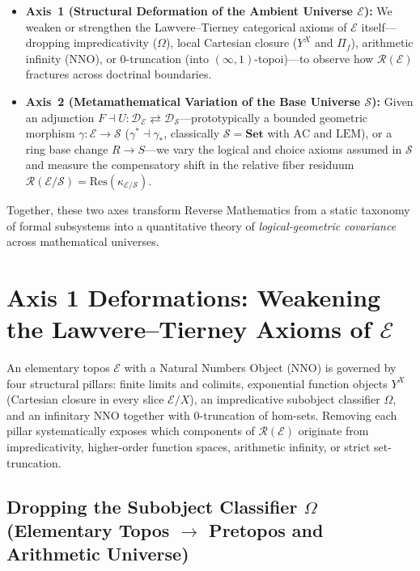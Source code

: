 \begin{itemize}

  \item \textbf{Axis~1 (Structural Deformation of the Ambient Universe $\mathcal{E}$):} We weaken or strengthen the Lawvere--Tierney categorical axioms of $\mathcal{E}$ itself---dropping impredicativity ($\Omega$), local Cartesian closure ($Y^X$ and $\Pi_f$), arithmetic infinity ($\mathrm{NNO}$), or $0$-truncation (into $(\infty,1)$-topoi)---to observe how $\mathcal{R}(\mathcal{E})$ fractures across doctrinal boundaries.

  \item \textbf{Axis~2 (Metamathematical Variation of the Base Universe $\mathcal{S}$):} Given an adjunction $F \dashv U : \mathcal{D}_{\mathcal{E}} \rightleftarrows \mathcal{D}_{\mathcal{S}}$---prototypically a bounded geometric morphism $\gamma : \mathcal{E} \to \mathcal{S}$ ($\gamma^* \dashv \gamma_*$, classically $\mathcal{S} = \mathbf{Set}$ with $\mathrm{AC}$ and $\mathrm{LEM}$), or a ring base change $R \to S$---we vary the logical and choice axioms assumed in $\mathcal{S}$ and measure the compensatory shift in the relative fiber residuum $\mathcal{R}(\mathcal{E}/\mathcal{S}) = \mathrm{Res}(\kappa_{\mathcal{E}/\mathcal{S}})$.

\end{itemize}

Together, these two axes transform Reverse Mathematics from a static taxonomy of formal subsystems into a quantitative theory of \emph{logical-geometric covariance} across mathematical universes.

\section{Axis 1 Deformations: Weakening the Lawvere--Tierney Axioms of $\mathcal{E}$}\label{sec:axis1-deformations}

An elementary topos $\mathcal{E}$ with a Natural Numbers Object ($\mathrm{NNO}$) is governed by four structural pillars: finite limits and colimits, exponential function objects $Y^X$ (Cartesian closure in every slice $\mathcal{E}/X$), an impredicative subobject classifier $\Omega$, and an infinitary $\mathrm{NNO}$ together with $0$-truncation of hom-sets. Removing each pillar systematically exposes which components of $\mathcal{R}(\mathcal{E})$ originate from impredicativity, higher-order function spaces, arithmetic infinity, or strict set-truncation.

\subsection{Dropping the Subobject Classifier $\Omega$ (Elementary Topos $\to$ Pretopos and Arithmetic Universe)}

